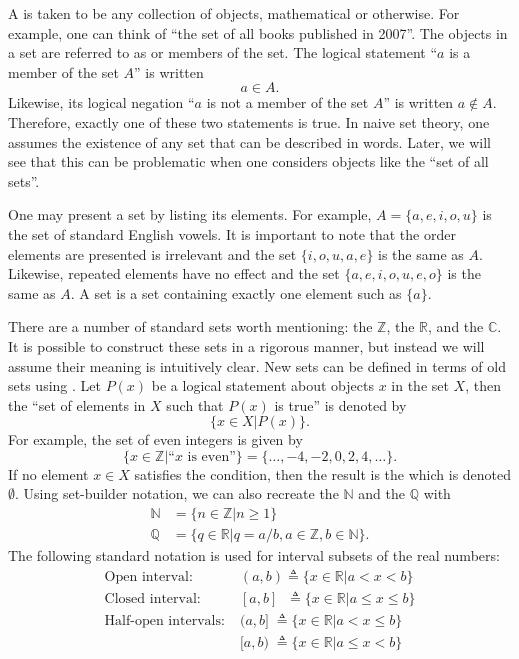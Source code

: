 A  is taken to be any collection of objects, mathematical or otherwise.
For example, one can think of ``the set of all books published in 2007''.
The objects in a set are referred to as  or members of the set.
The logical statement ``$a$ is a member of the set $A$'' is written
\[ a \in A. \]
Likewise, its logical negation ``$a$ is not a member of the set $A$'' is written $a \notin A$.
Therefore, exactly one of these two statements is true.
In naive set theory, one assumes the existence of any set that can be described in words.
Later, we will see that this can be problematic when one considers objects like the ``set of all sets''.

One may present a set by listing its elements.
For example, $A= \{ a,e,i,o,u \}$ is the set of standard English vowels.
It is important to note that the order elements are presented is irrelevant and the set $\{ i,o,u,a,e \}$ is the same as $A$.
Likewise, repeated elements have no effect and the set $\{ a,e,i,o,u,e,o \}$ is the same as $A$.
A  set is a set containing exactly one element such as $\{a\}$.

There are a number of standard sets worth mentioning: the  $\mathbb{Z}$, the  $\mathbb{R}$, and the  $\mathbb{C}$.
It is possible to construct these sets in a rigorous manner, but instead we will assume their meaning is intuitively clear.
New sets can be defined in terms of old sets using .
Let $P(x)$ be a logical statement about objects $x$ in the set $X$, then the ``set of elements in $X$ such that $P(x)$ is true'' is denoted by
\[ \{ x\in X | P(x) \}. \]
For example, the set of even integers is given by
\[ \{ x\in \mathbb{Z} | \textrm{``}x\textrm{ is even''} \} = \{ \ldots,-4,-2,0,2,4,\ldots \}. \]
If no element $x\in X$ satisfies the condition, then the result is the  which is denoted $\emptyset$.
Using set-builder notation, we can also recreate the  $\mathbb{N}$ and the  $\mathbb{Q}$ with
\begin{align*}
\mathbb{N} & = \{ n\in \mathbb{Z} | n\geq 1 \} \\
\mathbb{Q} & = \{ q\in \mathbb{R} | q=a/b, a\in \mathbb{Z}, b\in \mathbb{N} \}.
\end{align*}
The following standard notation is used for interval subsets of the real numbers:
\begin{align*}
\textrm{Open interval:} \; &  (a,b) \triangleq \{ x\in \mathbb{R} | a<x<b \} \\
\textrm{Closed interval:} \; & [a,b] \;\;\!\! \triangleq \{ x\in \mathbb{R} | a \leq x \leq b \} \\
\textrm{Half-open intervals:} \; & (a,b] \;\! \triangleq \{ x\in \mathbb{R} | a < x \leq b \} \\
& [a,b) \;\! \triangleq \{ x\in \mathbb{R} | a \leq x < b \}
\end{align*}

